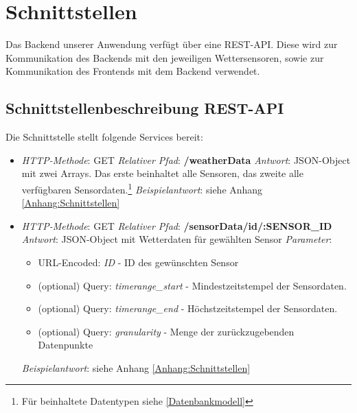 

\section{Schnittstellen}

Das Backend unserer Anwendung verfügt über eine REST-API. Diese wird zur Kommunikation des Backends mit den jeweiligen Wettersensoren, sowie zur Kommunikation des Frontends mit dem Backend verwendet.

\subsection{Schnittstellenbeschreibung REST-API}
Die Schnittstelle stellt folgende Services bereit:

\begin{itemize}
    \item \textsl{HTTP-Methode}: GET
    \subitem \textsl{Relativer Pfad}: \textbf{/weatherData}
    \subitem \textsl{Antwort}: JSON-Object mit zwei Arrays.
    Das erste beinhaltet alle Sensoren, das zweite alle verfügbaren Sensordaten.\footnote{Für beinhaltete Datentypen siehe \cref{Datenbankmodell}}%
    \subitem \textsl{Beispielantwort}: siehe Anhang \ref{Anhang:Schnittstellen}
\end{itemize}

\begin{itemize}
    \item \textsl{HTTP-Methode}: GET
    \subitem \textsl{Relativer Pfad}: \textbf{/sensorData/id/:SENSOR\_ID}
    \subitem \textsl{Antwort}: JSON-Object mit Wetterdaten für gewählten Sensor
    \subitem \textsl{Parameter}: \begin{itemize}
                                     \item URL-Encoded: \textit{ID} - ID des gewünschten Sensor
                                     \item (optional) Query:    \textit{timerange\_start} - Mindestzeitstempel der Sensordaten.
                                     \item (optional) Query:    \textit{timerange\_end} - Höchstzeitstempel der Sensordaten.
                                     \item (optional) Query: \textit{granularity} - Menge der zurückzugebenden Datenpunkte
    \end{itemize}
    \subitem \textsl{Beispielantwort}: siehe Anhang \ref{Anhang:Schnittstellen}
\end{itemize}

